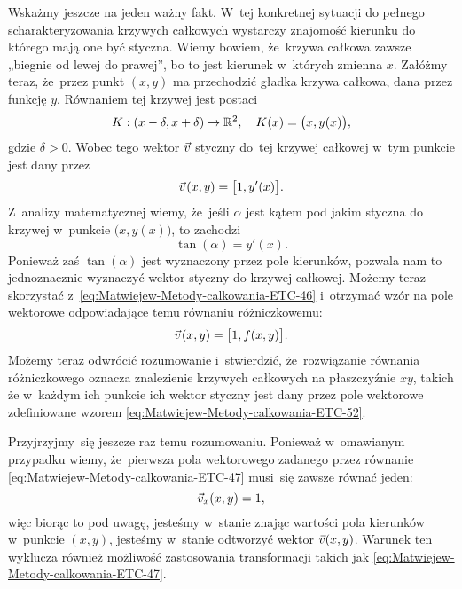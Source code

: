 \documentclass[a4paper,11pt]{article}
\numberwithin{equation}{section}
\begin{document}
Wskażmy jeszcze na jeden ważny fakt. W~tej konkretnej sytuacji do pełnego
scharakteryzowania krzywych całkowych wystarczy znajomość kierunku do
którego mają one być styczna. Wiemy bowiem, że~krzywa całkowa zawsze
„biegnie od lewej do prawej”, bo to jest kierunek w~których zmienna $x$.
Załóżmy teraz, że~przez punkt $( x, y )$ ma przechodzić gładka krzywa
całkowa, dana przez funkcję $y$. Równaniem tej krzywej jest postaci
\begin{equation}
  \label{eq:Matwiejew-Metody-calkowania-ETC-49}
  K : ( x - \delta, x + \delta ) \to \mathbb{R}^{ 2 }, \quad
  K( x ) = \big( x, y( x ) \big),
\end{equation}
gdzie $\delta > 0$. Wobec tego wektor $\vec{v}$ styczny do~tej krzywej całkowej
w~tym punkcie jest dany przez
\begin{equation}
  \label{eq:Matwiejew-Metody-calkowania-ETC-50}
  \vec{v} \hspace{0.09em} ( x, y ) =
  \big[ 1, y'( x ) \big].
\end{equation}
Z~analizy matematycznej wiemy, że~jeśli $\alpha$ jest kątem pod jakim styczna do
krzywej w~punkcie $\big( x, y( x ) \big)$, to zachodzi
\begin{equation}
  \label{eq:Matwiejew-Metody-calkowania-ETC-51}
  \tan( \alpha ) = y'( x ).
\end{equation}
Ponieważ zaś $\tan( \alpha )$ jest wyznaczony przez pole kierunków, pozwala nam
to jednoznacznie wyznaczyć wektor styczny do krzywej całkowej. Możemy teraz
skorzystać z~\eqref{eq:Matwiejew-Metody-calkowania-ETC-46} i~otrzymać wzór
na pole wektorowe odpowiadające temu równaniu różniczkowemu:
\begin{equation}
  \label{eq:Matwiejew-Metody-calkowania-ETC-52}
  \vec{v} \hspace{0.09em} ( x, y ) =
  \big[ 1, f( x, y ) \big].
\end{equation}
Możemy teraz odwrócić rozumowanie i~stwierdzić, że~rozwiązanie równania
różniczkowego oznacza znalezienie krzywych całkowych na płaszczyźnie $xy$,
takich że w~każdym ich punkcie ich wektor styczny jest dany przez pole
wektorowe zdefiniowane wzorem \eqref{eq:Matwiejew-Metody-calkowania-ETC-52}.

Przyjrzyjmy~się jeszcze raz temu rozumowaniu. Ponieważ w~omawianym
przypadku wiemy, że~pierwsza pola wektorowego zadanego przez równanie
\eqref{eq:Matwiejew-Metody-calkowania-ETC-47} musi~się zawsze równać jeden:
\begin{equation}
  \label{eq:Matwiejew-Metody-calkowania-ETC-53}
  \vec{v}_{ x }( x, y ) = 1,
\end{equation}
więc biorąc to pod uwagę, jesteśmy w~stanie znając wartości pola kierunków
w~punkcie $( x, y )$, jesteśmy w~stanie odtworzyć wektor $\vec{v}( x, y )$.
Warunek ten wyklucza również możliwość zastosowania transformacji takich jak
\eqref{eq:Matwiejew-Metody-calkowania-ETC-47}.
\end{document}
